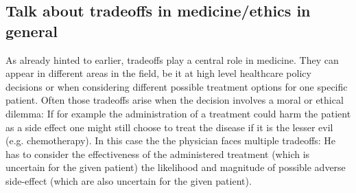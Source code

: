 	\subsection{Talk about tradeoffs in medicine/ethics in general}
	As already hinted to earlier, tradeoffs play a central role in medicine.
	They can appear in different areas in the field, be it at high level healthcare policy decisions or when considering different possible treatment options for one specific patient.
	Often those tradeoffs arise when the decision involves a moral or ethical dilemma:
	If for example the administration of a treatment could harm the patient as a side effect one might still choose to treat the disease if it is the lesser evil (e.g. chemotherapy\cite{oronsky2016medical}).
	In this case the the physician faces multiple tradeoffs:
	He has to consider the effectiveness of the administered treatment (which is uncertain for the given patient) the likelihood and magnitude of possible adverse side-effect (which are also uncertain for the given patient).
	